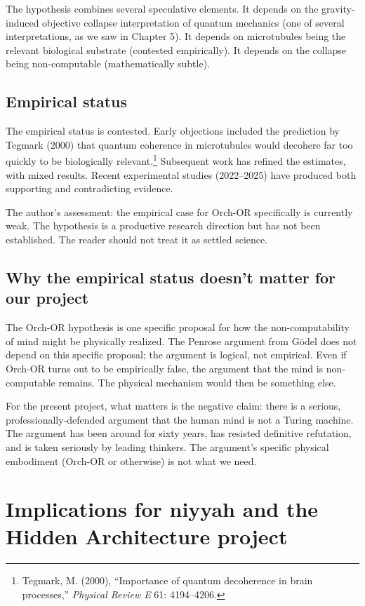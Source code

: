 The hypothesis combines several speculative elements. It depends on
the gravity-induced objective collapse interpretation of quantum
mechanics (one of several interpretations, as we saw in Chapter 5).
It depends on microtubules being the relevant biological substrate
(contested empirically). It depends on the collapse being
non-computable (mathematically subtle).

\subsection{Empirical status}

The empirical status is contested. Early objections included the
prediction by Tegmark (2000) that quantum coherence in microtubules
would decohere far too quickly to be biologically relevant.\footnote{Tegmark,
M. (2000), ``Importance of quantum decoherence in brain processes,''
\emph{Physical Review E} 61: 4194--4206.} Subsequent work has refined
the estimates, with mixed results. Recent experimental studies
(2022--2025) have produced both supporting and contradicting
evidence.

The author's assessment: the empirical case for Orch-OR specifically
is currently weak. The hypothesis is a productive research direction
but has not been established. The reader should not treat it as
settled science.

\subsection{Why the empirical status doesn't matter for our project}

The Orch-OR hypothesis is one specific proposal for how the
non-computability of mind might be physically realized. The Penrose
argument from G\"odel does not depend on this specific proposal;
the argument is logical, not empirical. Even if Orch-OR turns out
to be empirically false, the argument that the mind is non-computable
remains. The physical mechanism would then be something else.

For the present project, what matters is the negative claim: there
is a serious, professionally-defended argument that the human mind
is not a Turing machine. The argument has been around for sixty
years, has resisted definitive refutation, and is taken seriously
by leading thinkers. The argument's specific physical embodiment
(Orch-OR or otherwise) is not what we need.

\section{Implications for niyyah and the Hidden Architecture project}
\label{sec:non-comp-implications}

